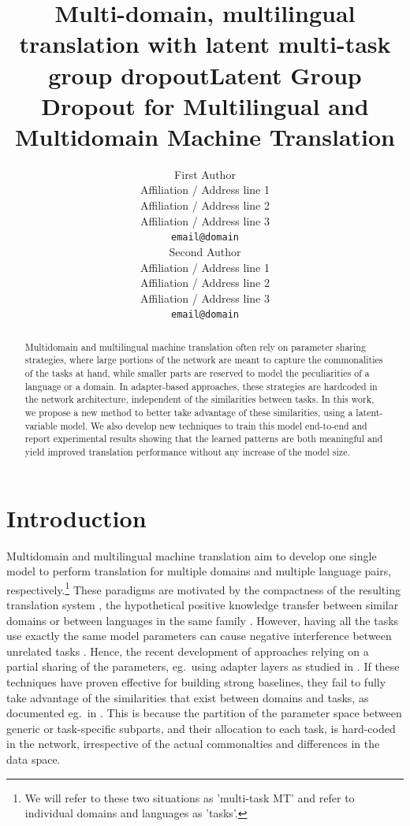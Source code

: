 \documentclass[11pt]{article}
\title{Multi-domain, multilingual translation with latent multi-task group dropout}
\title{Latent Group Dropout for Multilingual and Multidomain Machine Translation}
\author{First Author \\
  Affiliation / Address line 1 \\
  Affiliation / Address line 2 \\
  Affiliation / Address line 3 \\
  \texttt{email@domain} \\\And
  Second Author \\
  Affiliation / Address line 1 \\
  Affiliation / Address line 2 \\
  Affiliation / Address line 3 \\
  \texttt{email@domain} \\}
\begin{document}
\setlength{\abovedisplayskip}{3pt}
\setlength{\belowdisplayskip}{3pt}
\maketitle

\begin{abstract}
  Multidomain and multilingual machine translation often rely on parameter sharing strategies, where large portions of the network are meant to capture the commonalities of the tasks at hand, while smaller parts are reserved to model the peculiarities of a language or a domain. In adapter-based approaches, these strategies are hardcoded in the network architecture, independent of the similarities between tasks. In this work, we propose a new method to better take advantage of these similarities, using a latent-variable model. We also develop new techniques to train this model end-to-end and report experimental results showing that the learned patterns are both meaningful and yield improved translation performance without any increase of the model size. 
\end{abstract}

\section{Introduction}
Multidomain and multilingual machine translation aim to develop one single model to perform translation for multiple domains and multiple language pairs, respectively.\footnote{We will refer to these two situations as 'multi-task MT' and refer to individual domains and languages as 'tasks'.} These paradigms are motivated by the compactness of the resulting translation system \citep{Chu18multilingual,dabre20survey}, the hypothetical positive knowledge transfer between similar domains \citep{Pham21revisiting} or between languages in the same family \citep{Tan19multilingual}. However, having all the tasks use exactly the same model parameters can cause negative interference between unrelated tasks \citep{conneau20unsupervised,wang20negative}. Hence, the recent development of approaches relying on a partial sharing of the parameters, eg.\ using adapter layers as studied in \citep{houlsby19parameter,Bapna19simple,Pham20Study,Philip20monolingual}. If these techniques have proven effective for building strong baselines, they fail to fully take advantage of the similarities that exist between domains and tasks, as documented eg.\ in \citep{Pham21revisiting}. This is because the partition of the parameter space between generic or task-specific subparts, and their allocation to each task, is hard-coded in the network, irrespective of the actual commonalties and differences in the data space.
\end{document}
